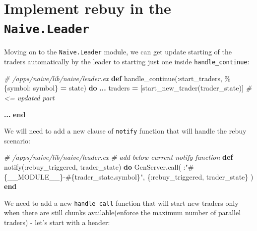 \documentclass[
]{book}
\newenvironment{Shaded}{\begin{snugshade}}{\end{snugshade}}
\newcommand{\CommentTok}[1]{\textcolor[rgb]{0.56,0.35,0.01}{\textit{#1}}}
\newcommand{\ConstantTok}[1]{\textcolor[rgb]{0.00,0.00,0.00}{#1}}
\newcommand{\KeywordTok}[1]{\textcolor[rgb]{0.13,0.29,0.53}{\textbf{#1}}}
\newcommand{\NormalTok}[1]{#1}
\newcommand{\OperatorTok}[1]{\textcolor[rgb]{0.81,0.36,0.00}{\textbf{#1}}}
\newcommand{\OtherTok}[1]{\textcolor[rgb]{0.56,0.35,0.01}{#1}}
\newcommand{\StringTok}[1]{\textcolor[rgb]{0.31,0.60,0.02}{#1}}
\newcommand{\VariableTok}[1]{\textcolor[rgb]{0.00,0.00,0.00}{#1}}
\begin{document}
\hypertarget{implement-rebuy-in-the-naive.leader}{%
\section{\texorpdfstring{Implement rebuy in the \texttt{Naive.Leader}}{Implement rebuy in the Naive.Leader}}\label{implement-rebuy-in-the-naive.leader}}

Moving on to the \texttt{Naive.Leader} module, we can get update starting of the traders automatically by the leader to starting just one inside \texttt{handle\_continue}:

\begin{Shaded}
\begin{Highlighting}[]
  \CommentTok{\# /apps/naive/lib/naive/leader.ex}
  \KeywordTok{def}\NormalTok{ handle\_continue(}\VariableTok{:start\_traders}\NormalTok{, \%\{}\VariableTok{symbol:}\NormalTok{ symbol\} }\OperatorTok{=}\NormalTok{ state) }\KeywordTok{do}
    \OperatorTok{...}
\NormalTok{    traders }\OperatorTok{=}\NormalTok{ [start\_new\_trader(trader\_state)] }\CommentTok{\# \textless{}= updated part}

    \OperatorTok{...}
  \KeywordTok{end}
\end{Highlighting}
\end{Shaded}

We will need to add a new clause of \texttt{notify} function that will handle the rebuy scenario:

\begin{Shaded}
\begin{Highlighting}[]
  \CommentTok{\# /apps/naive/lib/naive/leader.ex}
  \CommentTok{\# add below current \textasciigrave{}notify\textasciigrave{} function}
  \KeywordTok{def}\NormalTok{ notify(}\VariableTok{:rebuy\_triggered}\NormalTok{, trader\_state) }\KeywordTok{do}
    \ConstantTok{GenServer}\OperatorTok{.}\NormalTok{call(}
\NormalTok{      :}\StringTok{"}\OtherTok{\#\{}\ConstantTok{\_\_MODULE\_\_}\OtherTok{\}}\StringTok{{-}}\OtherTok{\#\{}\NormalTok{trader\_state}\OperatorTok{.}\NormalTok{symbol}\OtherTok{\}}\StringTok{"}\NormalTok{,}
\NormalTok{      \{}\VariableTok{:rebuy\_triggered}\NormalTok{, trader\_state\}}
\NormalTok{    )}
  \KeywordTok{end}
\end{Highlighting}
\end{Shaded}

We need to add a new \texttt{handle\_call} function that will start new traders only when there are still chunks available(enforce the maximum number of parallel
traders) - let's start with a header:
\end{document}

